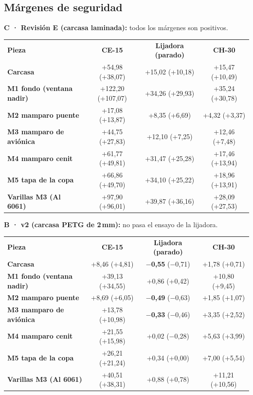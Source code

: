 \documentclass[10pt,a4paper]{article}
\begin{document}
\subsection{Márgenes de seguridad}
\textbf{C · Revisión E (carcasa laminada):} todos los márgenes son positivos.
\par{\small\noindent\begin{tabularx}{\linewidth}{LCCC}
\color{white}\bfseries Pieza & \color{white}\bfseries CE-15 & \color{white}\bfseries Lijadora (parado) & \color{white}\bfseries CH-30 \\
\bfseries Carcasa & +54,98 (+38,07) & +15,02 (+10,18) & +15,47 (+10,49) \\
\bfseries M1 fondo (ventana nadir) & +122,20 (+107,07) & +34,26 (+29,93) & +35,24 (+30,78) \\
\bfseries M2 mamparo puente & +17,08 (+13,87) & +8,35 (+6,69) & +4,32 (+3,37) \\
\bfseries M3 mamparo de aviónica & +44,75 (+27,83) & +12,10 (+7,25) & +12,46 (+7,48) \\
\bfseries M4 mamparo cenit & +61,77 (+49,81) & +31,47 (+25,28) & +17,46 (+13,94) \\
\bfseries M5 tapa de la copa & +66,86 (+49,70) & +34,10 (+25,22) & +18,96 (+13,91) \\
\bfseries Varillas M3 (Al 6061) & +97,90 (+96,01) & +39,87 (+36,16) & +28,09 (+27,53) \\
\end{tabularx}}
\par\medskip
\textbf{B · v2 (carcasa PETG de 2\,mm):} no pasa el ensayo de la lijadora.
\par{\small\noindent\begin{tabularx}{\linewidth}{LCCC}
\color{white}\bfseries Pieza & \color{white}\bfseries CE-15 & \color{white}\bfseries Lijadora (parado) & \color{white}\bfseries CH-30 \\
\bfseries Carcasa & +8,46 (+4,81) & \textcolor{rojo}{\bfseries $-$0,55} ($-$0,71) & +1,78 (+0,71) \\
\bfseries M1 fondo (ventana nadir) & +39,13 (+34,55) & +0,86 (+0,42) & +10,80 (+9,45) \\
\bfseries M2 mamparo puente & +8,69 (+6,05) & \textcolor{rojo}{\bfseries $-$0,49} ($-$0,63) & +1,85 (+1,07) \\
\bfseries M3 mamparo de aviónica & +13,78 (+10,98) & \textcolor{rojo}{\bfseries $-$0,33} ($-$0,46) & +3,35 (+2,52) \\
\bfseries M4 mamparo cenit & +21,55 (+15,98) & +0,02 ($-$0,28) & +5,63 (+3,99) \\
\bfseries M5 tapa de la copa & +26,21 (+21,24) & +0,34 (+0,00) & +7,00 (+5,54) \\
\bfseries Varillas M3 (Al 6061) & +40,51 (+38,31) & +0,88 (+0,78) & +11,21 (+10,56) \\
\end{tabularx}}
\end{document}
